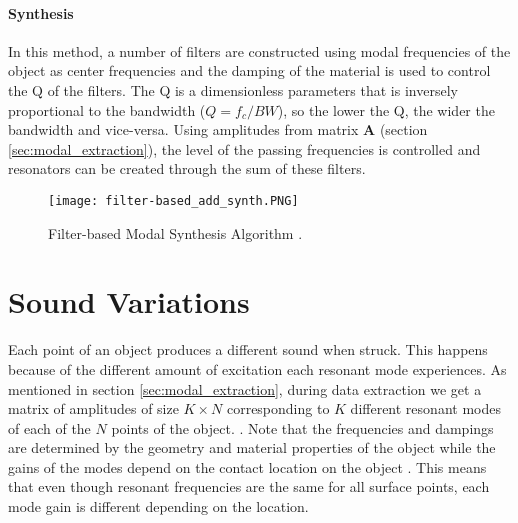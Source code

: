 \paragraph{Synthesis\\}\label{par:synth}

In this method, a number of filters are constructed using modal frequencies of the object as center frequencies and the damping of the material is used to control the \gls{Q} of the filters.  The \gls{Q} is a dimensionless parameters that is inversely proportional to the bandwidth ($Q=f_c/BW$), so the lower the \gls{Q}, the wider the bandwidth and vice-versa. Using amplitudes from matrix \textbf{A} (section \ref{sec:modal_extraction}), the level of the passing frequencies is controlled and resonators can be created through the sum of these filters. 

\begin{figure}[H]
  \centering
    \texttt{[image: filter-based\_add\_synth.PNG]}
      \caption{Filter-based Modal Synthesis Algorithm \cite{Cook:2002:RSS:515316}.}
      \label{fig:filter_synth}
\end{figure}

\section{Sound Variations} \label{sec:sound_variation}
Each point of an object produces a different sound when struck. This happens because of the different amount of excitation each resonant mode experiences. As mentioned in section \ref{sec:modal_extraction}, during data extraction we get a matrix of amplitudes of size $K\times N$ corresponding to $K$ different resonant modes of each of the $N$ points of the object. . Note that the frequencies and dampings are determined by the geometry and material properties of the object while the gains of the modes depend on the contact location on the
object \cite{van2001foleyautomatic}. This means that even though resonant frequencies are the same for all surface points, each mode gain is different depending on the location.

